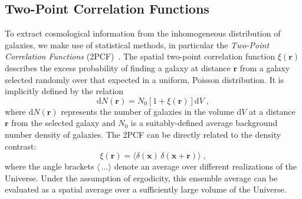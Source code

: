 \documentclass[12pt,a4paper,oneside]{report}
\begin{document}
\subsection{Two-Point Correlation Functions}\label{subsec:2PCF}
To extract cosmological information from the inhomogeneous distribution of galaxies, we make use of statistical methods, in particular the \textit{Two-Point Correlation Functions} (2PCF)~\cite{TwoPCF}. The spatial two-point correlation function $\xi (\mathbf{r})$ describes the excess probability of finding a galaxy at distance $\mathbf{r}$ from a galaxy selected randomly over that expected in a uniform, Poisson distribution. It is implicitly defined by the relation
\begin{equation}
  \mathrm{d} N (\mathbf{r}) = N_0 \left[ 1 + \xi (\mathbf{r}) \right] \mathrm{d} V \; ,
  \label{eq:2PCF}
\end{equation}
where $\mathrm{d} N (\mathbf{r})$ represents the number of galaxies in the volume $\mathrm{d} V$ at a distance $\mathbf{r}$ from the selected galaxy and $N_0$ is a suitably-defined average background number density of galaxies. The 2PCF can be directly related to the density contrast:
\begin{equation}
  \xi (\mathbf{r}) = \langle \delta (\mathbf{x}) \, \delta (\mathbf{x} + \mathbf{r}) \rangle \; ,
  \label{eq:2PCF_DensityContrast}
\end{equation}
where the angle brackets $\langle \, \dots \rangle$ denote an average over different realizations of the Universe. Under the assumption of ergodicity, this ensemble average can be evaluated as a spatial average over a sufficiently large volume of the Universe.
\end{document}
